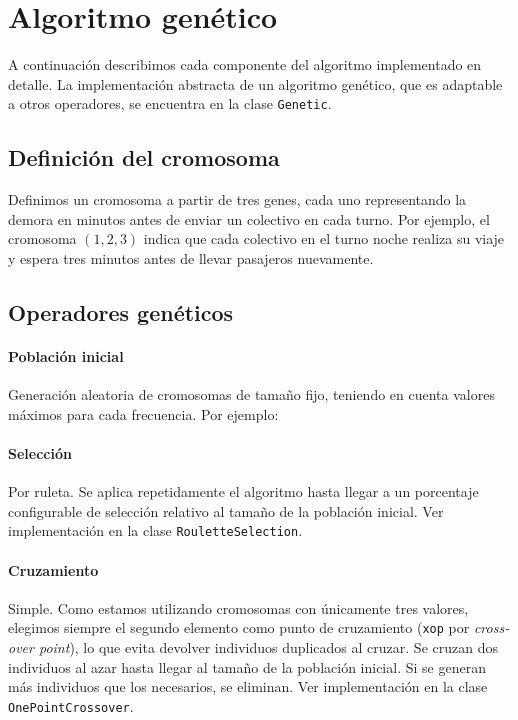 \documentclass[a4paper,12pt]{article}
\begin{document}
\section{Algoritmo genético}

A continuación describimos cada componente del algoritmo implementado en detalle.
La implementación abstracta de un algoritmo genético, que es adaptable a otros operadores, se encuentra en la clase \texttt{Genetic}.

\subsection{Definición del cromosoma}

Definimos un cromosoma a partir de tres genes, cada uno representando la demora en minutos antes de enviar un colectivo en cada turno.
Por ejemplo, el cromosoma $(1,2,3)$ indica que cada colectivo en el turno noche realiza su viaje y espera tres minutos antes de llevar pasajeros nuevamente.

\subsection{Operadores genéticos}

\paragraph{Población inicial} Generación aleatoria de cromosomas de tamaño fijo, teniendo en cuenta valores máximos para cada frecuencia.
Por ejemplo:



\paragraph{Selección} Por ruleta. Se aplica repetidamente el algoritmo hasta llegar a un porcentaje configurable de selección relativo al tamaño de la población inicial.
Ver implementación en la clase \texttt{RouletteSelection}.

\paragraph{Cruzamiento} Simple.
Como estamos utilizando cromosomas con únicamente tres valores, elegimos siempre el segundo elemento como punto de cruzamiento (\texttt{xop} por \textit{\foreignlanguage{english}{crossover point}}), lo que evita devolver individuos duplicados al cruzar.
Se cruzan dos individuos al azar hasta llegar al tamaño de la población inicial.
Si se generan más individuos que los necesarios, se eliminan.
Ver implementación en la clase \texttt{OnePointCrossover}.
\end{document}
